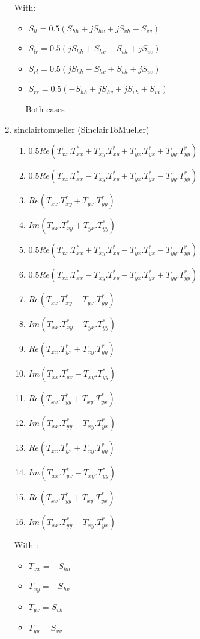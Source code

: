 \begin{enumerate}
With:
\begin{itemize} 
\item $ S_{ll} = 0.5(S_{hh}+j S_{hv}+j S_{vh}-S_{vv}) $ 
\item $ S_{lr} = 0.5(j S_{hh}+S_{hv}-S_{vh}+j S_{vv}) $ 
\item $ S_{rl} = 0.5(j S_{hh}-S_{hv}+ S_{vh}+j S_{vv}) $ 
\item $ S_{rr} = 0.5(-S_{hh}+j S_{hv}+j S_{vh}+S_{vv}) $ 
\end{itemize}

--- Both cases ---

\item sinclairtomueller (SinclairToMueller)
\begin{enumerate} 
\item $ 0.5 Re( T_{xx}.T_{xx}^{*} + T_{xy}.T_{xy}^{*} + T_{yx}.T_{yx}^{*} + T_{yy}.T_{yy}^{*} ) $ 
\item $ 0.5 Re( T_{xx}.T_{xx}^{*} - T_{xy}.T_{xy}^{*} + T_{yx}.T_{yx}^{*} - T_{yy}.T_{yy}^{*} ) $ 
\item $ Re( T_{xx}.T_{xy}^{*} + T_{yx}.T_{yy}^{*} ) $ 
\item $ Im( T_{xx}.T_{xy}^{*} + T_{yx}.T_{yy}^{*} ) $ 
\item $ 0.5 Re( T_{xx}.T_{xx}^{*} + T_{xy}.T_{xy}^{*} - T_{yx}.T_{yx}^{*} - T_{yy}.T_{yy}^{*} ) $ 
\item $ 0.5 Re( T_{xx}.T_{xx}^{*} - T_{xy}.T_{xy}^{*} - T_{yx}.T_{yx}^{*} + T_{yy}.T_{yy}^{*} ) $ 
\item $ Re( T_{xx}.T_{xy}^{*} - T_{yx}.T_{yy}^{*} ) $ 
\item $ Im( T_{xx}.T_{xy}^{*} - T_{yx}.T_{yy}^{*} ) $ 
\item $ Re( T_{xx}.T_{yx}^{*} + T_{xy}.T_{yy}^{*} ) $ 
\item $ Im( T_{xx}.T_{yx}^{*} - T_{xy}.T_{yy}^{*} ) $ 
\item $ Re( T_{xx}.T_{yy}^{*} + T_{xy}.T_{yx}^{*} ) $ 
\item $ Im( T_{xx}.T_{yy}^{*} - T_{xy}.T_{yx}^{*} ) $ 
\item $ Re( T_{xx}.T_{yx}^{*} + T_{xy}.T_{yy}^{*} ) $ 
\item $ Im( T_{xx}.T_{yx}^{*} - T_{xy}.T_{yy}^{*} ) $ 
\item $ Re( T_{xx}.T_{yy}^{*} + T_{xy}.T_{yx}^{*} ) $ 
\item $ Im( T_{xx}.T_{yy}^{*} - T_{xy}.T_{yx}^{*} ) $
\end{enumerate}

With :
\begin{itemize}
\item $ T_{xx} = -S_{hh} $ 
\item $ T_{xy} = -S_{hv} $ 
\item $ T_{yx} = S_{vh} $ 
\item $ T_{yy} = S_{vv} $ 
\end{itemize}
 

\end{enumerate}

